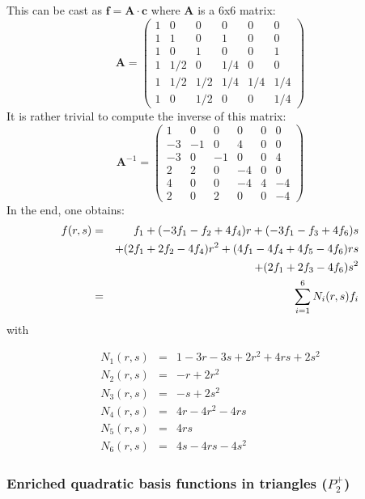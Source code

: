 This can be cast as ${\bm f}={\bm A}\cdot {\bm c}$ where ${\bm A}$ is a 6x6 matrix:
\[
{\bm A}=
\left(
\begin{array}{cccccc}
1&0   &  0  & 0   & 0   & 0\\
1&1   &  0  & 1   & 0   & 0\\
1&0   &  1  & 0   & 0   & 1\\
1&1/2 &  0  & 1/4 & 0   & 0\\
1&1/2 &  1/2& 1/4 & 1/4 & 1/4\\
1&0   &  1/2& 0   & 0   & 1/4
\end{array}
\right)
\]
It is rather trivial to compute the inverse of this matrix:
\[
{\bm A}^{-1}=
\left(
\begin{array}{cccccc}
1  & 0 & 0  & 0  & 0 & 0  \\
-3 & -1& 0  & 4  & 0 & 0 \\
-3 & 0 & -1 & 0  & 0 & 4 \\
2  & 2 & 0  & -4 & 0 & 0  \\
4  & 0 & 0  & -4 & 4 & -4 \\
2  & 0 & 2  & 0  & 0 & -4
\end{array}
\right)
\]
In the end, one obtains:
\begin{eqnarray}
f(r,s) 
&=& f_1 + (-3f_1-f_2+4f_4) r + (-3f_1-f_3+4f_6)s \nonumber\\
&& +(2f_1+2f_2-4f_4)r^2 + (4f_1-4f_4+4f_5-4f_6) rs \nonumber\\
&&+ (2f_1+2f_3-4f_6)s^2 \nonumber\\
&=& \sum_{i=1}^6 N_i(r,s) f_i
\end{eqnarray}
with
\begin{mdframed}[backgroundcolor=blue!5]
\begin{eqnarray}
N_1(r,s) &=& 1-3r-3s+2r^2+4rs+2s^2 \nonumber\\
N_2(r,s) &=& -r+2r^2 \nonumber\\
N_3(r,s) &=& -s+2s^2 \nonumber\\
N_4(r,s) &=& 4r-4r^2-4rs \nonumber\\
N_5(r,s) &=& 4rs \nonumber\\
N_6(r,s) &=& 4s-4rs-4s^2 \nonumber
\end{eqnarray}
\end{mdframed}


\subsubsection{Enriched quadratic basis functions in triangles ($P_2^+$)}

